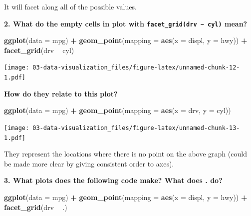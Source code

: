 \documentclass[]{book}
\newenvironment{Shaded}{\begin{snugshade}}{\end{snugshade}}
\newcommand{\DataTypeTok}[1]{\textcolor[rgb]{0.13,0.29,0.53}{#1}}
\newcommand{\KeywordTok}[1]{\textcolor[rgb]{0.13,0.29,0.53}{\textbf{#1}}}
\newcommand{\NormalTok}[1]{#1}
\newcommand{\OperatorTok}[1]{\textcolor[rgb]{0.81,0.36,0.00}{\textbf{#1}}}
\newcommand{\StringTok}[1]{\textcolor[rgb]{0.31,0.60,0.02}{#1}}
\theoremstyle{definition}
\theoremstyle{definition}
\theoremstyle{definition}
\theoremstyle{remark}
\begin{document}
It will facet along all of the possible values.

\textbf{2. What do the empty cells in plot with
\texttt{facet\_grid(drv\ \textasciitilde{}\ cyl)} mean?}

\begin{Shaded}
\begin{Highlighting}[]
\KeywordTok{ggplot}\NormalTok{(}\DataTypeTok{data =}\NormalTok{ mpg) }\OperatorTok{+}\StringTok{ }
\StringTok{  }\KeywordTok{geom_point}\NormalTok{(}\DataTypeTok{mapping =} \KeywordTok{aes}\NormalTok{(}\DataTypeTok{x =}\NormalTok{ displ, }\DataTypeTok{y =}\NormalTok{ hwy)) }\OperatorTok{+}\StringTok{ }
\StringTok{  }\KeywordTok{facet_grid}\NormalTok{(drv }\OperatorTok{~}\StringTok{ }\NormalTok{cyl)}
\end{Highlighting}
\end{Shaded}

\texttt{[image: 03-data-visualization\_files/figure-latex/unnamed-chunk-12-1.pdf]}

\textbf{How do they relate to this plot?}

\begin{Shaded}
\begin{Highlighting}[]
\KeywordTok{ggplot}\NormalTok{(}\DataTypeTok{data =}\NormalTok{ mpg) }\OperatorTok{+}\StringTok{ }
\StringTok{  }\KeywordTok{geom_point}\NormalTok{(}\DataTypeTok{mapping =} \KeywordTok{aes}\NormalTok{(}\DataTypeTok{x =}\NormalTok{ drv, }\DataTypeTok{y =}\NormalTok{ cyl))}
\end{Highlighting}
\end{Shaded}

\texttt{[image: 03-data-visualization\_files/figure-latex/unnamed-chunk-13-1.pdf]}

They represent the locations where there is no point on the above graph
(could be made more clear by giving consistent order to axes).

\textbf{3. What plots does the following code make? What does . do?}

\begin{Shaded}
\begin{Highlighting}[]
\KeywordTok{ggplot}\NormalTok{(}\DataTypeTok{data =}\NormalTok{ mpg) }\OperatorTok{+}\StringTok{ }
\StringTok{  }\KeywordTok{geom_point}\NormalTok{(}\DataTypeTok{mapping =} \KeywordTok{aes}\NormalTok{(}\DataTypeTok{x =}\NormalTok{ displ, }\DataTypeTok{y =}\NormalTok{ hwy)) }\OperatorTok{+}
\StringTok{  }\KeywordTok{facet_grid}\NormalTok{(drv }\OperatorTok{~}\StringTok{ }\NormalTok{.)}
\end{Highlighting}
\end{Shaded}
\end{document}
